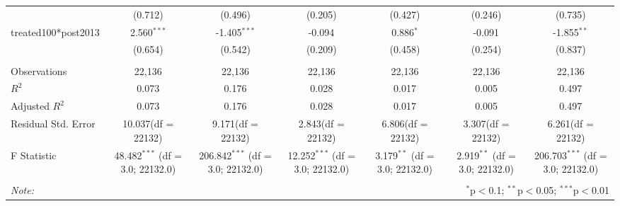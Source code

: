 \documentclass[12pt]{article}
\begin{document}
\begin{table}[!htbp]
\begin{tabular}{@{\extracolsep{5pt}}lcccccc}
  & (0.712) & (0.496) & (0.205) & (0.427) & (0.246) & (0.735) \\
 treated100*post2013 & 2.560$^{***}$ & -1.405$^{***}$ & -0.094$^{}$ & 0.886$^{*}$ & -0.091$^{}$ & -1.855$^{**}$ \\
  & (0.654) & (0.542) & (0.209) & (0.458) & (0.254) & (0.837) \\
\hline \\[-1.8ex]
 Observations & 22,136 & 22,136 & 22,136 & 22,136 & 22,136 & 22,136 \\
 $R^2$ & 0.073 & 0.176 & 0.028 & 0.017 & 0.005 & 0.497 \\
 Adjusted $R^2$ & 0.073 & 0.176 & 0.028 & 0.017 & 0.005 & 0.497 \\
 Residual Std. Error & 10.037(df = 22132) & 9.171(df = 22132) & 2.843(df = 22132) & 6.806(df = 22132) & 3.307(df = 22132) & 6.261(df = 22132)  \\
 F Statistic & 48.482$^{***}$ (df = 3.0; 22132.0) & 206.842$^{***}$ (df = 3.0; 22132.0) & 12.252$^{***}$ (df = 3.0; 22132.0) & 3.179$^{**}$ (df = 3.0; 22132.0) & 2.919$^{**}$ (df = 3.0; 22132.0) & 206.703$^{***}$ (df = 3.0; 22132.0) \\
\hline
\hline \\[-1.8ex]
\textit{Note:} & \multicolumn{6}{r}{$^{*}$p$<$0.1; $^{**}$p$<$0.05; $^{***}$p$<$0.01} \\
\end{tabular}
\end{table}
\end{document}
